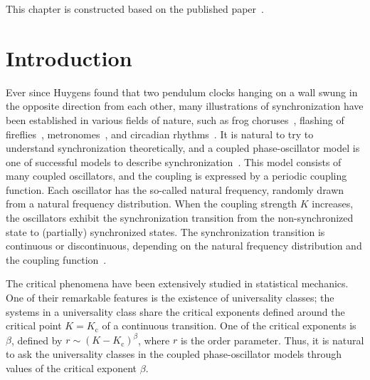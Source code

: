 
This chapter is constructed based on the published paper~\cite{yoneda2020}.

\section{Introduction}
Ever since Huygens found that two pendulum clocks hanging on a wall swung in the opposite direction from each other,
many illustrations of synchronization have been established in various fields of nature,
such as frog choruses~\cite{aihara2014}, flashing of fireflies~\cite{smith1935,buck1968},
metronomes~\cite{pantaleone2002}, and circadian rhythms~\cite{winfree1967}.
It is natural to try to understand synchronization theoretically,
and a coupled phase-oscillator model is one of successful models to describe synchronization~\cite{kuramoto2019}.
This model consists of many coupled oscillators,
and the coupling is expressed by a periodic coupling function.
Each oscillator has the so-called natural frequency, randomly drawn from a natural frequency distribution.
When the coupling strength $K$ increases,
the oscillators exhibit the synchronization transition
from the non-synchronized state to (partially) synchronized states.
The synchronization transition is continuous or discontinuous,
depending on the natural frequency distribution and the coupling function~\cite{kuramoto1975,strogatz2000,chiba2015,daido2015,basnarkov2007,pazo2005,daido1990,crawford1995,chiba2011,pikovsky2013,komarov2014}.

The critical phenomena have been extensively studied in statistical mechanics.
One of their remarkable features is the existence of universality classes;
the systems in a universality class share the critical exponents defined around the critical point $K=K_{\mathrm{c}}$ of a continuous transition.
One of the critical exponents is $\beta$,
defined by $r\sim(K-K_{\mathrm{c}})^{\beta}$, where $r$ is the order parameter.
Thus, it is natural to ask the universality classes in the coupled phase-oscillator models
through values of the critical exponent $\beta$.

